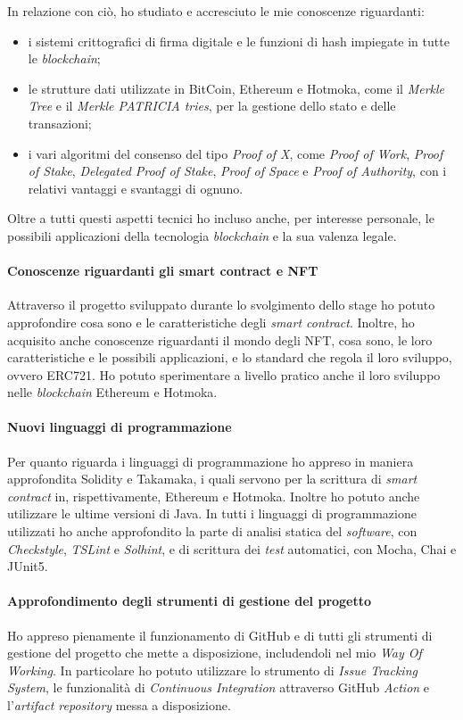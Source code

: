 \noindent In relazione con ciò, ho studiato e accresciuto le mie conoscenze riguardanti: 
\begin{itemize}
  \item i sistemi crittografici di firma digitale e le funzioni di hash impiegate in tutte le \textit{blockchain};
  \item le strutture dati utilizzate in BitCoin, Ethereum e Hotmoka, come il \textit{Merkle Tree} e il \textit{Merkle PATRICIA tries}, per la gestione dello stato e delle transazioni;
  \item i vari algoritmi del consenso del tipo \textit{Proof of X}, come \textit{Proof of Work}, \textit{Proof of Stake}, \textit{Delegated Proof of Stake}, \textit{Proof of Space} e \textit{Proof of Authority}, con i relativi vantaggi e svantaggi di ognuno.
\end{itemize}

Oltre a tutti questi aspetti tecnici ho incluso anche, per interesse personale, le possibili applicazioni della tecnologia \textit{blockchain} e la sua valenza legale.

\paragraph{Conoscenze riguardanti gli smart contract e NFT}
Attraverso il progetto sviluppato durante lo svolgimento dello stage ho potuto approfondire cosa sono e le caratteristiche degli \textit{smart contract}. Inoltre, ho acquisito anche conoscenze riguardanti il mondo degli NFT, cosa sono, le loro caratteristiche e le possibili applicazioni, e lo standard che regola il loro sviluppo, ovvero ERC721. Ho potuto sperimentare a livello pratico anche il loro sviluppo nelle \textit{blockchain} Ethereum e Hotmoka.

\paragraph{Nuovi linguaggi di programmazione}
Per quanto riguarda i linguaggi di programmazione ho appreso in maniera approfondita Solidity e Takamaka, i quali servono per la scrittura di \textit{smart contract} in, rispettivamente, Ethereum e Hotmoka. Inoltre ho potuto anche utilizzare le ultime versioni di Java.
In tutti i linguaggi di programmazione utilizzati ho anche approfondito la parte di analisi statica del \textit{software}, con \textit{Checkstyle}, \textit{TSLint} e \textit{Solhint}, e di scrittura dei \textit{test} automatici, con Mocha, Chai e JUnit5.

\paragraph{Approfondimento degli strumenti di gestione del progetto}
Ho appreso pienamente il funzionamento di GitHub e di tutti gli strumenti di gestione del progetto che mette a disposizione, includendoli nel mio \textit{Way Of Working}. In particolare ho potuto utilizzare lo strumento di \textit{Issue Tracking System}, le funzionalità di \textit{Continuous Integration} attraverso GitHub \textit{Action} e l'\textit{artifact repository} messa a disposizione.
